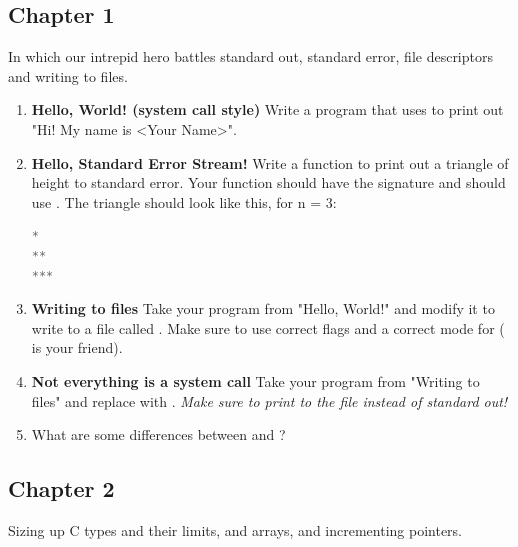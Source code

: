 \subsection{Chapter 1}

In which our intrepid hero battles standard out, standard error, file descriptors and writing to files.

\begin{enumerate}
\item \textbf{Hello, World! (system call style)} Write a program that uses  to print out "Hi! My name is <Your Name>".
\item \textbf{Hello, Standard Error Stream!} Write a function to print out a triangle of height  to standard error.
Your function should have the signature  and should use .
The triangle should look like this, for n = 3:
\begin{lstlisting}[language=C]
*
**
***
\end{lstlisting}
\item \textbf{Writing to files} Take your program from "Hello, World!" and modify it to write to a file called . Make sure to use correct flags and a correct mode for  ( is your friend).
\item \textbf{Not everything is a system call} Take your program from "Writing to files" and replace  with . \textit{Make sure to print to the file instead of standard out!}
\item What are some differences between  and ?
\end{enumerate}

\subsection{Chapter 2}

Sizing up C types and their limits,  and  arrays, and incrementing pointers.

